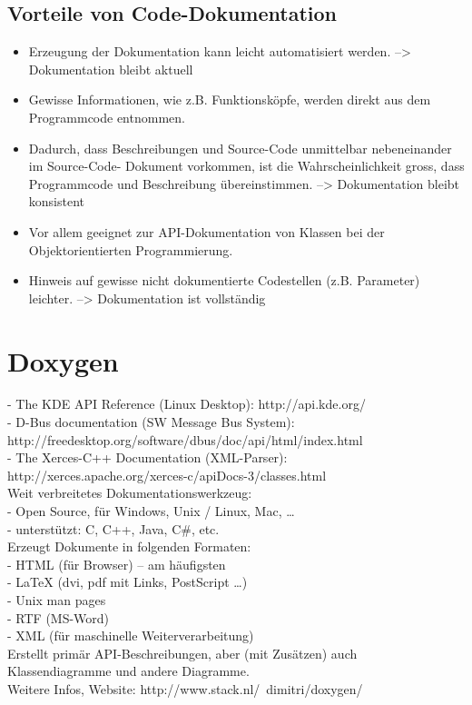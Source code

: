 \subsection{Vorteile von Code-Dokumentation}
\begin{itemize}
	\item Erzeugung der Dokumentation kann leicht automatisiert werden. --> Dokumentation bleibt aktuell
	\item Gewisse Informationen, wie z.B. Funktionsköpfe, werden direkt aus dem Programmcode 
	entnommen.  
	\item Dadurch, dass Beschreibungen und Source-Code unmittelbar nebeneinander im Source-Code-
	Dokument vorkommen, ist die Wahrscheinlichkeit gross, dass Programmcode und Beschreibung 
	übereinstimmen. --> Dokumentation bleibt konsistent
	\item Vor allem geeignet zur API-Dokumentation von Klassen bei der Objektorientierten 
	Programmierung.
	\item Hinweis auf gewisse nicht dokumentierte Codestellen (z.B. Parameter) leichter. --> Dokumentation ist vollständig
\end{itemize}

\section{Doxygen}
- The KDE API Reference (Linux Desktop): http://api.kde.org/ \\
- D-Bus documentation (SW Message Bus System): http://freedesktop.org/software/dbus/doc/api/html/index.html \\
- The Xerces-C++ Documentation (XML-Parser): http://xerces.apache.org/xerces-c/apiDocs-3/classes.html \\

Weit verbreitetes Dokumentationswerkzeug:  \\
- Open Source, für Windows, Unix / Linux, Mac, … \\
- unterstützt: C, C++, Java, C\#, etc. \\

Erzeugt Dokumente in folgenden Formaten: \\
- HTML (für Browser) – am häufigsten \\
- LaTeX (dvi, pdf mit Links, PostScript …) \\
- Unix man pages \\
- RTF (MS-Word) \\
- XML (für maschinelle Weiterverarbeitung) \\
Erstellt primär API-Beschreibungen, aber (mit Zusätzen) auch Klassendiagramme und andere 
Diagramme. \\
Weitere Infos, Website:  http://www.stack.nl/~dimitri/doxygen/

